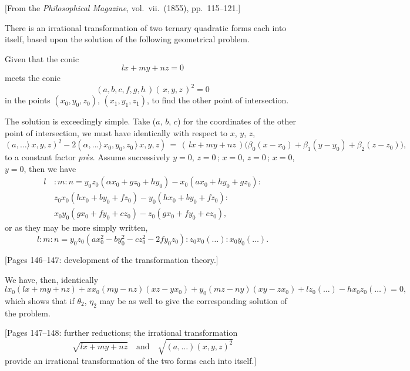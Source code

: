 \documentclass[11pt,a4paper]{book}
\begin{document}
[From the \textit{Philosophical Magazine}, vol.\ vii.\ (1855), pp.\ 115--121.]

\medskip

There is an irrational transformation of two ternary quadratic forms each into
itself, based upon the solution of the following geometrical problem.

\medskip

Given that the conic
\[
lx + my + nz = 0
\]
meets the conic
\[
(a, b, c, f, g, h\,)(\,x, y, z\,)^2 = 0
\]
in the points $(x_0, y_0, z_0)$, $(x_1, y_1, z_1)$, to find the other point of intersection.

\medskip

The solution is exceedingly simple. Take ($a$, $b$, $c$) for the coordinates of the
other point of intersection, we must have identically with respect to $x$, $y$, $z$,
\[
(a,\ldots\!\rangle\, x, y, z)^2 - 2(\alpha,\ldots\!\rangle\, x_0, y_0, z_0\,\rangle\, x, y, z)
\,=\, (\,lx + my + nz\,)\big(\beta_0(x-x_0) + \beta_1(y-y_0) + \beta_2(z-z_0)\big),
\]
to a constant factor \textit{pr\`es}. Assume successively $y=0$, $z=0$\,; $x=0$, $z=0$\,; $x=0$, $y=0$, then we have
\begin{align*}
l\,&:m:n = y_0 z_0(\alpha x_0 + g z_0 + h y_0) - x_0(a x_0 + h y_0 + g z_0): \\
& z_0 x_0 (h x_0 + b y_0 + f z_0) - y_0(h x_0 + b y_0 + f z_0): \\
& x_0 y_0 (g x_0 + f y_0 + c z_0) - z_0(g x_0 + f y_0 + c z_0),
\end{align*}
or as they may be more simply written,
\[
l: m: n = y_0 z_0 (a x_0^2 - b y_0^2 - c z_0^2 - 2f y_0 z_0): z_0 x_0(\ldots): x_0 y_0(\ldots).
\]

\medskip

[Pages 146--147: development of the transformation theory.]

\medskip

We have, then, identically
\[
l x_0 (lx + m y + nz) + x x_0 (m y - n z)(x z - y x_0)
+ y_0 (m z - n y)(x y - z x_0) + l z_0 (\ldots) - h x_0 z_0(\ldots) = 0,
\]
which shows that if $\theta_2$, $\eta_2$ may be as well to give the
corresponding solution of the problem.

\medskip

[Pages 147--148: further reductions; the irrational transformation
\[
\sqrt{l x + my + nz}\quad \text{and}\quad \sqrt{(a,\ldots)(x,y,z)^2}
\]
provide an irrational transformation of the two forms each into itself.]

\medskip
\end{document}
